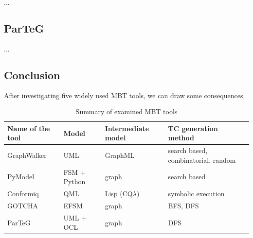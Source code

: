 ...


\subsection{ParTeG}
\label{sub:parteg}

...



\subsection{Conclusion}
\label{sub:conclusion}

After investigating five widely used MBT tools, we can draw some consequences.

\begin{table}[htb]
\begin{center}
\begin{tabular}{|l|l|l|l|}
\hline
	\textbf{Name of the tool} & \textbf{Model} & \textbf{Intermediate model} & \textbf{TC generation method}\\\hline
	GraphWalker & UML & GraphML & search based, combinatorial, random\\\hline
	PyModel & FSM + Python & graph & search based\\\hline
	Conformiq & QML & Lisp (CQ$\lambda$) & symbolic execution\\\hline
	GOTCHA & EFSM & graph & BFS, DFS\\\hline
	ParTeG & UML + OCL & graph & DFS\\
\hline
\end{tabular}
\end{center}
\caption{\label{tab:toolssummary} Summary of examined MBT tools}
\end{table}

